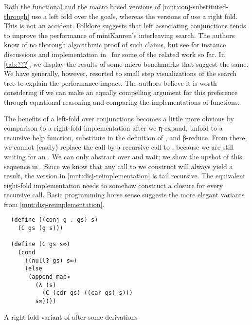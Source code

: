\documentclass[sigplan,balance,pbalance,natbib=false]{acmart}
\begin{document}
Both the functional and the macro based versions of
\cref{mnt:conj-substituted-through} use a left fold over the goals,
whereas the versions of  use a right fold. This is
not an accident.
%
%
Folklore suggests that left associating conjunctions tends to improve
the performance of miniKanren's interleaving search. The authors know
of no thorough algorithmic proof of such claims, but see for instance
discussions and implementation in~\cite{rosenblatt2019first} for some
of the related work so far. In \cref{tab:???}, we display the results
of some micro benchmarks that suggest the same. We have generally,
however, resorted to small step visualizations of the search tree to
explain the performance impact. The authors believe it is worth
considering if we can make an equally compelling argument for this
preference through equational reasoning and comparing the
implementations of functions.

The benefits of a left-fold over conjunctions becomes a little more
obvious by comparison to a right-fold implementation after we
η-expand, unfold to a recursive help function, substitute in the
definition of , and β-reduce. From there, we cannot
(easily) replace the  call by a recursive call
to , because we are still waiting for an .
We can only abstract over  and wait; we show the upshot
of this sequence in . Since we
know that any call to  we construct will
always yield a result, the version in \cref{mnt:disj-reimplementation}
is tail recursive. The equivalent right-fold implementation needs to
somehow construct a closure for every recursive call. Basic
programming horse sense suggests the more elegant variants from
\cref{mnt:disj-reimplementation}.

\begin{listing}
\begin{verbatim}
  (define ((conj g . gs) s)
    (C gs (g s)))

  (define (C gs s∞)
    (cond
      ((null? gs) s∞)
      (else
       (append-map∞
         (λ (s)
           (C (cdr gs) ((car gs) s)))
         s∞))))
\end{verbatim}
  \caption{A right-fold variant of  after some derivations}\label{mnt:conj-right-fold-definition}
\end{listing}
\end{document}
